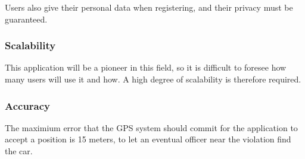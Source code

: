     Users also give their personal data when registering, and their privacy must be guaranteed.

\subsubsection{Scalability}
    This application will be a pioneer in this field, so it is difficult to foresee how many users will
    use it and how. A high degree of scalability is therefore required.

\subsubsection{Accuracy}
    The maximium error that the GPS system should commit for the application to accept a position is 15 meters,
    to let an eventual officer near the violation find the car.
